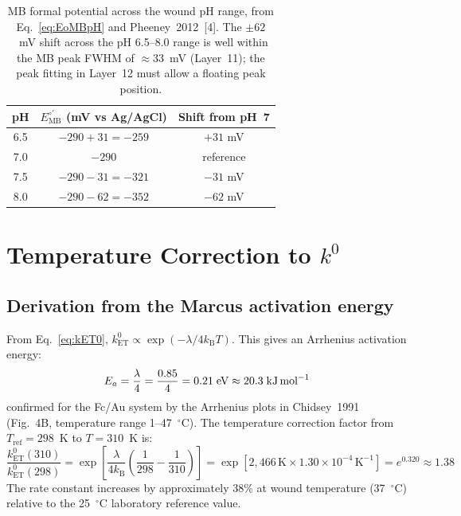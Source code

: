 \documentclass[10pt,a4paper]{article}
\numberwithin{equation}{section}
\newcommand{\kET}{k_{\text{ET}}^{0}}
\newcommand{\cit}[1]{[#1]}
\newcommand{\Eo}{E^{\circ\prime}}
\newcommand{\kB}{k_{\text{B}}}
\begin{document}
\begin{table}[H]
\centering
\small\renewcommand{\arraystretch}{1.2}
\begin{tabular}{@{}ccc@{}}
\toprule
pH & $\Eo_{\text{MB}}$ (mV vs Ag/AgCl) & Shift from pH~7 \\
\midrule
6.5 & $-290 + 31 = -259$ & $+31$ mV \\
7.0 & $-290$             & reference \\
7.5 & $-290 - 31 = -321$ & $-31$ mV \\
8.0 & $-290 - 62 = -352$ & $-62$ mV \\
\bottomrule
\end{tabular}
\caption{MB formal potential across the wound pH range, from
Eq.~\eqref{eq:EoMBpH} and Pheeney~2012~\cit{4}. The $\pm62$~mV
shift across the pH 6.5--8.0 range is well within the MB peak FWHM
of $\approx 33$~mV (Layer~11); the peak fitting in Layer~12 must
allow a floating peak position.}
\label{tab:EopH}
\end{table}

\section{Temperature Correction to $k^0$}
\label{sec:temp}

\subsection{Derivation from the Marcus activation energy}

From Eq.~\eqref{eq:kET0}, $\kET \propto \exp(-\lambda/4\kB T)$.
This gives an Arrhenius activation energy:
\begin{equation}
  E_a = \frac{\lambda}{4} = \frac{0.85}{4} = 0.21\;\text{eV}
  \approx 20.3\;\text{kJ\,mol}^{-1}
  \label{eq:Ea}
\end{equation}
confirmed for the Fc/Au system by the Arrhenius plots in Chidsey~1991
(Fig.~4B, temperature range 1--47~$^\circ$C). The temperature
correction factor from $T_{\text{ref}} = 298$~K to $T = 310$~K is:
\begin{equation}
  \frac{\kET(310)}{\kET(298)}
  = \exp\!\left[\frac{\lambda}{4\kB}\left(\frac{1}{298} - \frac{1}{310}\right)\right]
  = \exp\!\left[2{,}466\,\text{K} \times 1.30 \times 10^{-4}\,\text{K}^{-1}\right]
  = e^{0.320} \approx 1.38
  \label{eq:Tcorr}
\end{equation}
The rate constant increases by approximately 38\% at wound temperature
(37~$^\circ$C) relative to the 25~$^\circ$C laboratory reference
value.
\end{document}
